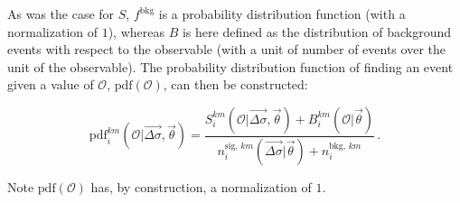 % 
As was the case for $S$, $f^\text{bkg}$ is a probability distribution function (with a normalization of $1$), whereas $B$ is here defined as the distribution of background events with respect to the observable (with a unit of number of events over the unit of the observable).
% 
The probability distribution function of finding an event given a value of $\mathcal{O}$, $\text{pdf}(\mathcal{O})$, can then be constructed:
% 
\begin{linenomath*}
\begin{equation}
\text{pdf}_i^{km}(\mathcal{O} | \vec{\Delta\sigma}, \vec{\theta})
= \frac{
        S^{km}_{i}( \mathcal{O} | \vec{\Delta\sigma}, \vec{\theta})
        + B^{km}_i(\mathcal{O}|\vec{\theta})
    }{
        n_i^{\text{sig},\,km}(\vec{\Delta\sigma} | \vec{\theta})
        + n^{\text{bkg},\,km}_i
    }
\,.
\end{equation}
\end{linenomath*}
% 
Note $\text{pdf}(\mathcal{O})$ has, by construction, a normalization of $1$.



